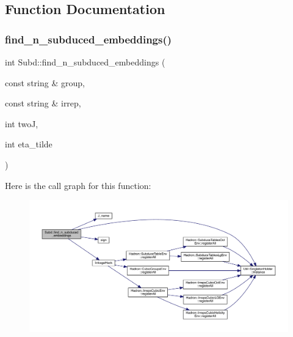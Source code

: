 \subsection{Function Documentation}
\mbox{\label{namespaceSubd_a7a3fcd97f1cf40eb963e278240d0ff3e}} 
\subsubsection{\texorpdfstring{find\_n\_subduced\_embeddings()}{find\_n\_subduced\_embeddings()}}
{\footnotesize\ttfamily int Subd\+::find\+\_\+n\+\_\+subduced\+\_\+embeddings (\begin{DoxyParamCaption}\item[{const string \&}]{group,  }\item[{const string \&}]{irrep,  }\item[{int}]{twoJ,  }\item[{int}]{eta\+\_\+tilde }\end{DoxyParamCaption})}

Here is the call graph for this function\+:
\nopagebreak
\begin{figure}[H]
\begin{center}
\leavevmode
\includegraphics[width=350pt]{d8/d2b/namespaceSubd_a7a3fcd97f1cf40eb963e278240d0ff3e_cgraph}
\end{center}
\end{figure}
\mbox{\label{namespaceSubd_ae0133abbe7b9e31a6eafd50c5a2320e3}} 
